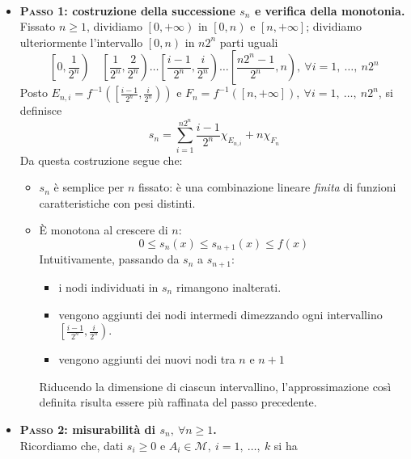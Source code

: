 \begin{demonstration}~{}
	\begin{itemize}
		\item \textbf{\textsc{Passo 1}: costruzione della successione $s_n$ e verifica della monotonia.}\\
		Fissato $n\geq 1$, dividiamo $\left[0,+\infty\right)$ in $\left[0,n\right)$ e $\left[n,+\infty\right]$; dividiamo ulteriormente l'intervallo $\left[0,n\right)$ in $n2^n$ parti uguali
		\begin{equation*}
			\left[0,\frac{1}{2^n}\right)\quad\left[\frac{1}{2^n},\frac{2}{2^n}\right)\ldots\left[\frac{i-1}{2^n},\frac{i}{2^n}\right)\ldots\left[\frac{n2^n-1}{2^n},n\right),\ \forall i=1,\ \ldots,\ n2^n
		\end{equation*}
	Posto $E_{n,i}=f^{-1}\left(\left[\frac{i-1}{2^n},\frac{i}{2^n}\right)\right)$ e $F_n=f^{-1}\left(\left[n,+\infty\right]\right),\ \forall i=1,\ \ldots,\ n2^n$, si definisce
	\begin{equation}
		s_n=\sum_{i=1}^{n2^n}\frac{i-1}{2^n}\chi_{E_{n,i}}+n\chi_{F_n}
	\end{equation}
Da questa costruzione segue che:
\begin{itemize}
	\item $s_n$ è semplice per $n$ fissato: è una combinazione lineare \textit{finita} di funzioni caratteristiche con pesi distinti.
	\item È monotona al crescere di $n$:
	\begin{equation*}
		0\leq s_n\left(x\right)\leq s_{n+1}\left(x\right)\leq f\left(x\right) 
	\end{equation*}
	Intuitivamente, passando da $s_n$ a $s_{n+1}$:
	\begin{itemize}
		\item i nodi individuati in $s_n$ rimangono inalterati.
		\item vengono aggiunti dei nodi intermedi dimezzando ogni intervallino $\left[\frac{i-1}{2^n},\frac{i}{2^n}\right)$.
		\item vengono aggiunti dei nuovi nodi tra $n$ e $n+1$
	\end{itemize}
	Riducendo la dimensione di ciascun intervallino, l'approssimazione così definita risulta essere più raffinata del passo precedente.
\end{itemize}
\item  \textbf{\textsc{Passo 2}: misurabilità di $s_n,\ \forall n\geq 1$.}\\
Ricordiamo che, dati $s_i\geq 0$ e $A_i\in\mathcal{M},\ i=1,\ \ldots,\ k$ si ha

\end{itemize}
\end{demonstration}
